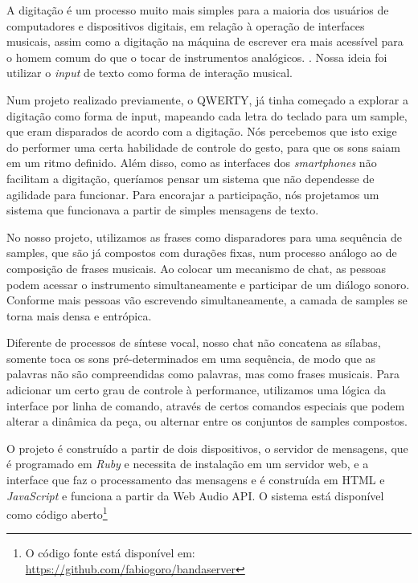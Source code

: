 A digitação é um processo muito mais simples para a maioria dos usuários de computadores e dispositivos digitais, em relação à operação de interfaces musicais, assim como a digitação na máquina de escrever era mais acessível para o homem comum do que o tocar de instrumentos analógicos. \cite[172]{Levinson2001}. Nossa ideia foi utilizar o \emph{input} de texto como forma de interação musical. 

Num projeto realizado previamente, o QWERTY, já tinha começado a explorar a digitação como forma de input, mapeando cada letra do teclado para um sample, que eram disparados de acordo com a digitação. Nós percebemos que isto exige do performer uma certa habilidade de controle do gesto, para que os sons saiam em um ritmo definido. Além disso, como as interfaces dos \emph{smartphones} não facilitam a digitação, queríamos pensar um sistema que não dependesse de agilidade para funcionar. Para encorajar a participação, nós projetamos um sistema que funcionava a partir de simples mensagens de texto.

No nosso projeto, utilizamos as frases como disparadores para uma sequência de samples, que são já compostos com durações fixas, num processo análogo ao de composição de frases musicais. Ao colocar um mecanismo de chat, as pessoas podem acessar o instrumento simultaneamente e participar de um diálogo sonoro. Conforme mais pessoas vão escrevendo simultaneamente, a camada de samples se torna mais densa e entrópica.

Diferente de processos de síntese vocal, nosso chat não concatena as sílabas, somente toca os sons pré-determinados em uma sequência, de modo que as palavras não são compreendidas como palavras, mas como frases musicais. Para adicionar um certo grau de controle à performance, utilizamos uma lógica da interface por linha de comando, através de certos comandos especiais que podem alterar a dinâmica da peça, ou alternar entre os conjuntos de samples compostos.

O projeto é construído a partir de dois dispositivos, o servidor de mensagens, que é programado em \emph{Ruby} e necessita de instalação em um servidor web, e a interface que faz o processamento das mensagens e é construída em HTML e \emph{JavaScript} e funciona a partir da Web Audio API. O sistema está disponível como código aberto\footnote{O código fonte está disponível em: \url{https://github.com/fabiogoro/bandaserver}}   

